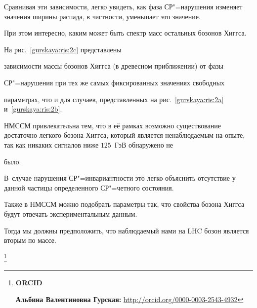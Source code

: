 Сравнивая эти зависимости, легко увидеть, как фаза СР"=нарушения изменяет значения ширины распада, в частности, уменьшает это значение. 

При этом интересно, каким может быть спектр масс остальных бозонов Хиггса. 

На рис.~\ref{gurskaya:ris:2c} представлены

зависимости массы бозонов Хиггса (в древесном приближении) от фазы

СР"=нарушения при тех же самых фиксированных значениях свободных

параметрах, что и для случаев, представленных на рис.~\ref{gurskaya:ris:2a} и~\ref{gurskaya:ris:2b}.



НМССМ привлекательна тем, что в её рамках возможно существование достаточно легкого бозона Хиггса, который является ненаблюдаемым на опыте, так как никаких сигналов ниже $125$~ГэВ обнаружено не

было. 

В~случае нарушения СР"=инвариантности это легко объяснить отсутствие у данной частицы определенного СР"=четного состояния.

Также в НМССМ можно подобрать параметры так, что свойства бозона Хиггса будут отвечать экспериментальным данным. 

Тогда мы должны предположить, что наблюдаемый нами на LHC бозон является вторым по массе.









\smallskip









\thanks{{\bf ORCID}



{\bf Альбина Валентиновна Гурская:} \url{http://orcid.org/0000-0003-2543-4932}



}





\RusRef





